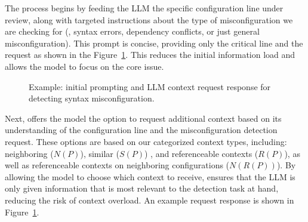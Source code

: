  The process begins by feeding the LLM the specific configuration line under review, along with targeted instructions about the type of misconfiguration we are checking for (\eg, syntax errors, dependency conflicts, or just general misconfiguration). This prompt is concise, providing only the critical line and the request as shown in the Figure~\ref{fig:initial_prompt}. This reduces the initial information load and allows the model to focus on the core issue.


    \begin{figure}[tb]
    \centering
    \caption{Example: initial prompting and LLM context request response for detecting syntax misconfiguration.}
    \label{fig:initial_prompt}
\end{figure}

 Next, \sysname{} offers the model the option to request additional context based on its understanding of the configuration line and the misconfiguration detection request. These options are based on our categorized context types, including: neighboring (\( N(P) \)), similar (\(S(P) \)) , and referenceable contexts (\( R(P) \)), as well as referenceable contexts on neighboring configurations (\( N(R(P)) \)). By allowing the model to choose which context to receive, \sysname{} ensures that the LLM is only given information that is most relevant to the detection task at hand, reducing the risk of context overload. An example request response is shown in Figure~\ref{fig:initial_prompt}.
    
